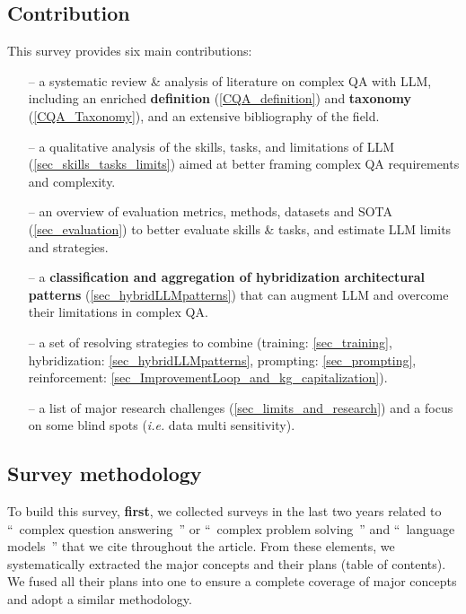 \documentclass[acmsmall]{acmart}
\begin{document}
\subsection{Contribution}
This survey provides six main contributions:
\begin{enumerate}
\item[--] a systematic review \& analysis of literature on complex QA with LLM, including an enriched \textbf{definition} (\autoref{CQA_definition}) and \textbf{taxonomy} (\autoref{CQA_Taxonomy}), and an extensive bibliography of the field.
\item[--] a qualitative analysis of the skills, tasks, and limitations of LLM (\autoref{sec_skills_tasks_limits}) aimed at better framing complex QA requirements and complexity.
\item[--] an overview of evaluation metrics, methods, datasets and SOTA (\autoref{sec_evaluation}) to better evaluate skills \& tasks, and estimate LLM limits and strategies.
\item[--] a \textbf{classification and aggregation of hybridization architectural patterns} (\autoref{sec_hybridLLMpatterns}) that can augment LLM and overcome their limitations in complex QA. 
\item[--] a set of resolving strategies to combine (training: \autoref{sec_training}, hybridization: \autoref{sec_hybridLLMpatterns}, prompting: \autoref{sec_prompting}, reinforcement: \autoref{sec_ImprovementLoop_and_kg_capitalization}).
\item[--] a list of major research challenges (\autoref{sec_limits_and_research}) and a focus on some blind spots (\textsl{i.e.} data multi sensitivity).
\end{enumerate}

\subsection{Survey methodology}

To build this survey, \textbf{first}, we  collected surveys in the last two years related to ``~complex question answering~'' or ``~complex problem solving~'' and ``~language models~''  that we cite throughout the article. From these elements, we systematically extracted the major concepts and their plans (table of contents). We fused all their plans into one to ensure a complete coverage of major concepts and adopt a similar methodology.
\end{document}
